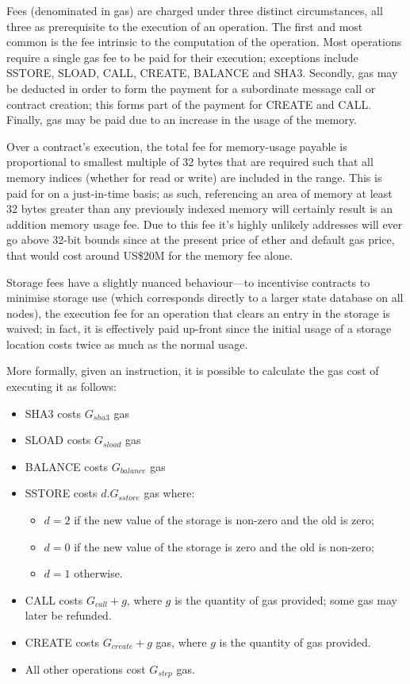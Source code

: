 \documentclass[9pt,oneside]{amsart}
\begin{document}
\begin{multicols}{2}
Fees (denominated in gas) are charged under three distinct circumstances, all three as prerequisite to the execution of an operation. The first and most common is the fee intrinsic to the computation of the operation. Most operations require a single gas fee to be paid for their execution; exceptions include {\small SSTORE}, {\small SLOAD}, {\small CALL}, {\small CREATE}, {\small BALANCE} and {\small SHA3}. Secondly, gas may be deducted in order to form the payment for a subordinate message call or contract creation; this forms part of the payment for {\small CREATE} and {\small CALL}. Finally, gas may be paid due to an increase in the usage of the memory.

Over a contract's execution, the total fee for memory-usage payable is proportional to smallest multiple of 32 bytes that are required such that all memory indices (whether for read or write) are included in the range. This is paid for on a just-in-time basis; as such, referencing an area of memory at least 32 bytes greater than any previously indexed memory will certainly result is an addition memory usage fee. Due to this fee it's highly unlikely addresses will ever go above 32-bit bounds since at the present price of ether and default gas price, that would cost around US\$20M for the memory fee alone.

Storage fees have a slightly nuanced behaviour---to incentivise contracts to minimise storage use (which corresponds directly to a larger state database on all nodes), the execution fee for an operation that clears an entry in the storage is waived; in fact, it is effectively paid up-front since the initial usage of a storage location costs twice as much as the normal usage.

More formally, given an instruction, it is possible to calculate the gas cost of executing it as follows:

\begin{itemize}
\item {\small SHA3} costs $G_{sha3}$ gas
\item {\small SLOAD} costs $G_{sload}$ gas
\item {\small BALANCE} costs $G_{balance}$ gas
\item {\small SSTORE} costs $d.G_{sstore}$ gas where:
\begin{itemize}
\item $d = 2$ if the new value of the storage is non-zero and the old is zero;
\item $d = 0$ if the new value of the storage is zero and the old is non-zero;
\item $d = 1$ otherwise.
\end{itemize}
\item {\small CALL} costs $G_{call} + g$, where $g$ is the quantity of gas provided; some gas may later be refunded.
\item {\small CREATE} costs $G_{create} + g$ gas, where $g$ is the quantity of gas provided.
\item All other operations cost $G_{step}$ gas.
\end{itemize}


\end{multicols}
\end{document}
